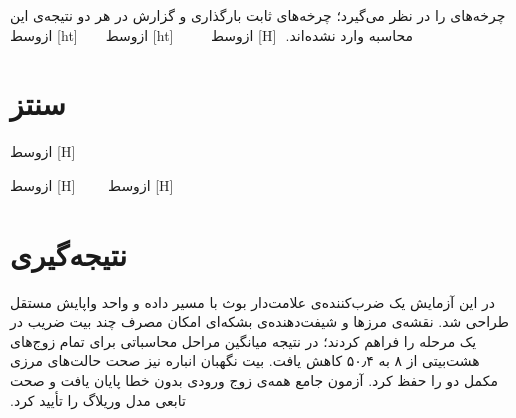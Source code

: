 ‫چرخه‌های  را در نظر می‌گیرد؛ چرخه‌های ثابت بارگذاری و گزارش در هر دو نتیجه‌ی این
‫محاسبه وارد نشده‌اند.
‫
‫[H]
‫‌ازوسط
‫
‫
‫
‫
‫
‫
‫
‫[ht]
‫‌ازوسط
‫%
‫
‫
‫
‫
‫[ht]
‫‌ازوسط
‫%
‫
‫
‫
‫
‫
‫\section{سنتز }
‫
‫[H]
‫‌ازوسط

‫
‫
‫
‫
‫[H]
‫‌ازوسط
‫
‫
‫
‫
‫
‫
‫[H]
‫‌ازوسط
‫
‫
‫
‫
‫
‫
‫
‫\section{نتیجه‌گیری}
‫
‫در این آزمایش یک ضرب‌کننده‌ی علامت‌دار بوث با مسیر داده و واحد واپایش مستقل طراحی شد. نقشه‌ی
‫مرزها و شیفت‌دهنده‌ی بشکه‌ای امکان مصرف چند بیت ضریب در یک مرحله را فراهم کردند؛ در نتیجه
‫میانگین مراحل محاسباتی برای تمام زوج‌های هشت‌بیتی از ۸ به ۵۰٫۴ کاهش یافت. بیت نگهبان انباره
‫نیز صحت حالت‌های مرزی مکمل دو را حفظ کرد. آزمون جامع همه‌ی زوج ورودی بدون خطا
‫پایان یافت و صحت تابعی مدل وریلاگ را تأیید کرد.
‫
‫
‫
‫